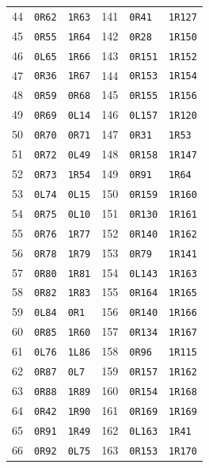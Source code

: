 \begin{longtable}{@{}rll@{\qquad\qquad}rll@{}}
44 & \texttt{0R62} & \texttt{1R63} & 141 & \texttt{0R41} & \texttt{1R127}\\
45 & \texttt{0R55} & \texttt{1R64} & 142 & \texttt{0R28} & \texttt{1R150}\\
46 & \texttt{0L65} & \texttt{1R66} & 143 & \texttt{0R151} & \texttt{1R152}\\
47 & \texttt{0R36} & \texttt{1R67} & 144 & \texttt{0R153} & \texttt{1R154}\\
48 & \texttt{0R59} & \texttt{0R68} & 145 & \texttt{0R155} & \texttt{1R156}\\
49 & \texttt{0R69} & \texttt{0L14} & 146 & \texttt{0L157} & \texttt{1R120}\\
50 & \texttt{0R70} & \texttt{0R71} & 147 & \texttt{0R31} & \texttt{1R53}\\
51 & \texttt{0R72} & \texttt{0L49} & 148 & \texttt{0R158} & \texttt{1R147}\\
52 & \texttt{0R73} & \texttt{1R54} & 149 & \texttt{0R91} & \texttt{1R64}\\
53 & \texttt{0L74} & \texttt{0L15} & 150 & \texttt{0R159} & \texttt{1R160}\\
54 & \texttt{0R75} & \texttt{0L10} & 151 & \texttt{0R130} & \texttt{1R161}\\
55 & \texttt{0R76} & \texttt{1R77} & 152 & \texttt{0R140} & \texttt{1R162}\\
56 & \texttt{0R78} & \texttt{1R79} & 153 & \texttt{0R79} & \texttt{1R141}\\
57 & \texttt{0R80} & \texttt{1R81} & 154 & \texttt{0L143} & \texttt{1R163}\\
58 & \texttt{0R82} & \texttt{1R83} & 155 & \texttt{0R164} & \texttt{1R165}\\
59 & \texttt{0L84} & \texttt{0R1} & 156 & \texttt{0R140} & \texttt{1R166}\\
60 & \texttt{0R85} & \texttt{1R60} & 157 & \texttt{0R134} & \texttt{1R167}\\
61 & \texttt{0L76} & \texttt{1L86} & 158 & \texttt{0R96} & \texttt{1R115}\\
62 & \texttt{0R87} & \texttt{0L7} & 159 & \texttt{0R157} & \texttt{1R162}\\
63 & \texttt{0R88} & \texttt{1R89} & 160 & \texttt{0R154} & \texttt{1R168}\\
64 & \texttt{0R42} & \texttt{1R90} & 161 & \texttt{0R169} & \texttt{1R169}\\
65 & \texttt{0R91} & \texttt{1R49} & 162 & \texttt{0L163} & \texttt{1R41}\\
66 & \texttt{0R92} & \texttt{0L75} & 163 & \texttt{0R153} & \texttt{1R170}\\

\end{longtable}
